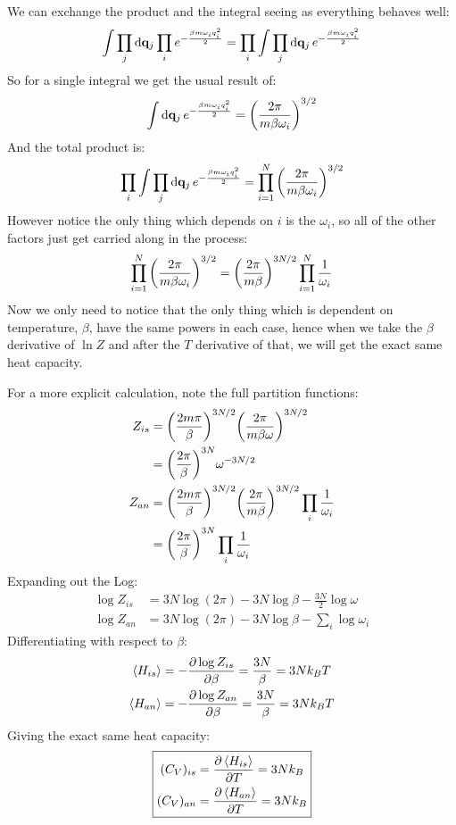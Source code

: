 \documentclass[12pt]{article}
\begin{document}
We can exchange the product and the integral seeing as everything behaves well:
\begin{align*}
  \int\prod_j\dd{\vb{q}_j}\prod_ie^{-\frac{\beta m\omega_iq_i^2}{2}}=
  \prod_i\int\prod_j\dd{\vb{q}_j}e^{-\frac{\beta m\omega_iq_i^2}{2}}
\end{align*}
So for a single integral we get the usual result of:
\begin{align*}
  \int\dd{\vb{q}_j}e^{-\frac{\beta m\omega_iq_i^2}{2}}=
  \qty(\frac{2\pi}{m\beta\omega_i})^{3/2}
\end{align*}
And the total product is:
\begin{align*}
  \prod_i\int\prod_j\dd{\vb{q}_j}e^{-\frac{\beta m\omega_iq_i^2}{2}}=
  \prod_{i=1}^N\qty(\frac{2\pi}{m\beta\omega_i})^{3/2}
\end{align*}
However notice the only thing which depends on $i$ is the $\omega_i$, so all of the other factors just get carried along in the process:
\begin{align*}
  \prod_{i=1}^N\qty(\frac{2\pi}{m\beta\omega_i})^{3/2}=
  \qty(\frac{2\pi}{m\beta})^{3N/2}\prod_{i=1}^N\frac1{\omega_i}
\end{align*}
Now we only need to notice that the only thing which is dependent on temperature, $\beta$, have the same powers in each case, hence when we take the $\beta$ derivative of $\ln Z$ and after the $T$ derivative of that, we will get the exact same heat capacity.

For a more explicit calculation, note the full partition functions:
\begin{align*}
  Z_{is}&=\qty(\frac{2m\pi}{\beta})^{3N/2}
  \qty(\frac{2\pi}{m\beta\omega})^{3N/2}\\
  &=\qty(\frac{2\pi}{\beta})^{3N}\omega^{-3N/2}\\
  Z_{an}&=\qty(\frac{2m\pi}{\beta})^{3N/2}
  \qty(\frac{2\pi}{m\beta})^{3N/2}\prod_i\frac1{\omega_i}\\
  &=\qty(\frac{2\pi}{\beta})^{3N}\prod_i\frac1{\omega_i}
\end{align*}
Expanding out the Log:
\begin{align*}
  \log Z_{is}&=3N\log(2\pi)-3N\log\beta-\frac{3N}{2}\log\omega\\
  \log Z_{an}&=3N\log(2\pi)-3N\log\beta-\sum_i\log\omega_i
\end{align*}
Differentiating with respect to $\beta$:
\begin{align*}
  \ev{H_{is}}&=-\pdv{\log Z_{is}}{\beta}=\frac{3N}{\beta}=3Nk_BT\\
  \ev{H_{an}}&=-\pdv{\log Z_{an}}{\beta}=\frac{3N}{\beta}=3Nk_BT
\end{align*}
Giving the exact same heat capacity:
\begin{equation}
  \boxed{
    \begin{aligned}
      (C_V)_{is}&=\pdv{\ev{H_{is}}}{T}=3Nk_B\\
      (C_V)_{an}&=\pdv{\ev{H_{an}}}{T}=3Nk_B
    \end{aligned}
  }
\end{equation}
\end{document}
